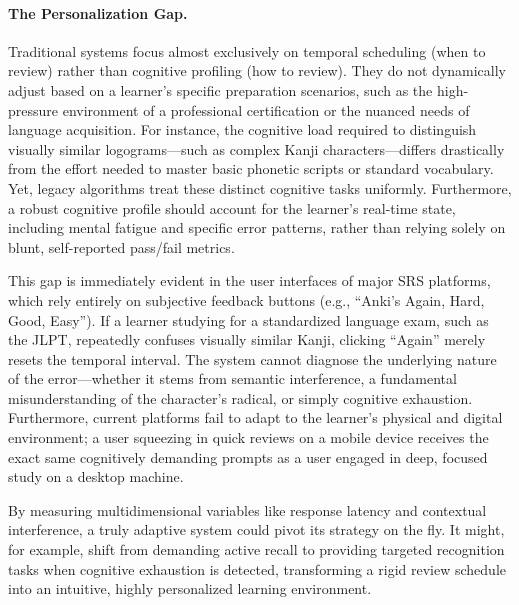 \paragraph{The Personalization Gap.}
Traditional systems focus almost exclusively on temporal scheduling (when to review) rather than cognitive profiling (how to review). They do not dynamically adjust based on a learner's specific preparation scenarios, such as the high-pressure environment of a professional certification or the nuanced needs of language acquisition. For instance, the cognitive load required to distinguish visually similar logograms—such as complex Kanji characters—differs drastically from the effort needed to master basic phonetic scripts or standard vocabulary. Yet, legacy algorithms treat these distinct cognitive tasks uniformly. Furthermore, a robust cognitive profile should account for the learner's real-time state, including mental fatigue and specific error patterns, rather than relying solely on blunt, self-reported pass/fail metrics.

This gap is immediately evident in the user interfaces of major SRS platforms, which rely entirely on subjective feedback buttons (e.g., ``Anki's Again, Hard, Good, Easy''). If a learner studying for a standardized language exam, such as the JLPT, repeatedly confuses visually similar Kanji, clicking ``Again'' merely resets the temporal interval. The system cannot diagnose the underlying nature of the error—whether it stems from semantic interference, a fundamental misunderstanding of the character's radical, or simply cognitive exhaustion. Furthermore, current platforms fail to adapt to the learner's physical and digital environment; a user squeezing in quick reviews on a mobile device receives the exact same cognitively demanding prompts as a user engaged in deep, focused study on a desktop machine.

By measuring multidimensional variables like response latency and contextual interference, a truly adaptive system could pivot its strategy on the fly. It might, for example, shift from demanding active recall to providing targeted recognition tasks when cognitive exhaustion is detected, transforming a rigid review schedule into an intuitive, highly personalized learning environment.